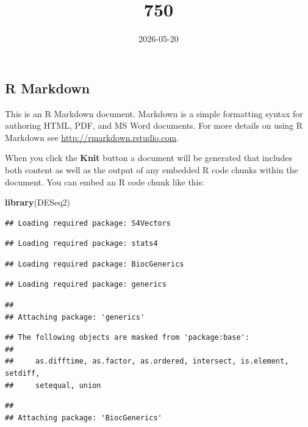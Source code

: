 \documentclass[
]{article}
\title{750}
\author{}
\date{\vspace{-2.5em}2026-05-20}
\newenvironment{Shaded}{\begin{snugshade}}{\end{snugshade}}
\newcommand{\FunctionTok}[1]{\textcolor[rgb]{0.13,0.29,0.53}{\textbf{#1}}}
\newcommand{\NormalTok}[1]{#1}
\begin{document}
\maketitle

\subsection{R Markdown}\label{r-markdown}

This is an R Markdown document. Markdown is a simple formatting syntax
for authoring HTML, PDF, and MS Word documents. For more details on
using R Markdown see \url{http://rmarkdown.rstudio.com}.

When you click the \textbf{Knit} button a document will be generated
that includes both content as well as the output of any embedded R code
chunks within the document. You can embed an R code chunk like this:

\begin{Shaded}
\begin{Highlighting}[]
\FunctionTok{library}\NormalTok{(DESeq2)}
\end{Highlighting}
\end{Shaded}

\begin{verbatim}
## Loading required package: S4Vectors
\end{verbatim}

\begin{verbatim}
## Loading required package: stats4
\end{verbatim}

\begin{verbatim}
## Loading required package: BiocGenerics
\end{verbatim}

\begin{verbatim}
## Loading required package: generics
\end{verbatim}

\begin{verbatim}
## 
## Attaching package: 'generics'
\end{verbatim}

\begin{verbatim}
## The following objects are masked from 'package:base':
## 
##     as.difftime, as.factor, as.ordered, intersect, is.element, setdiff,
##     setequal, union
\end{verbatim}

\begin{verbatim}
## 
## Attaching package: 'BiocGenerics'
\end{verbatim}
\end{document}

